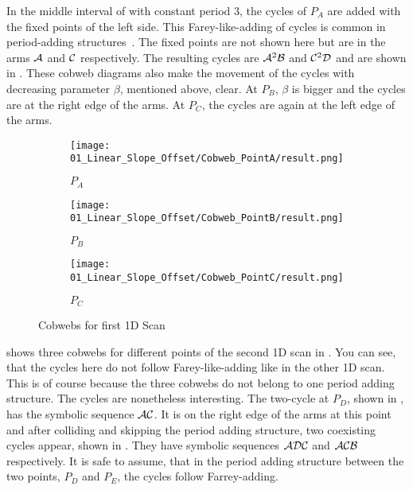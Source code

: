 In the middle interval of  with constant period 3, the cycles of $P_A$ are added with the fixed points of the left side.
This Farey-like-adding of cycles is common in period-adding structures~\cite{avrutin2019continuous}.
The fixed points are not shown here but are in the arms $\mathcal{A}$ and $\mathcal{C}$ respectively.
The resulting cycles are $\mathcal{A}^2\mathcal{B}$ and $\mathcal{C}^2\mathcal{D}$ and are shown in .
These cobweb diagrams also make the movement of the cycles with decreasing parameter $\beta$, mentioned above, clear.
At $P_B$, $\beta$ is bigger and the cycles are at the right edge of the arms.
At $P_C$, the cycles are again at the left edge of the arms.

\begin{figure}
    \centering
    \begin{subfigure}{0.3\textwidth}
        \centering
        \texttt{[image: 01\_Linear\_Slope\_Offset/Cobweb\_PointA/result.png]}
        \caption{$P_A$}
        \label{fig:pcw.lin.CobwebA}
    \end{subfigure}
    \begin{subfigure}{0.3\textwidth}
        \centering
        \texttt{[image: 01\_Linear\_Slope\_Offset/Cobweb\_PointB/result.png]}
        \caption{$P_B$}
        \label{fig:pcw.lin.CobwebB}
    \end{subfigure}
    \begin{subfigure}{0.3\textwidth}
        \centering
        \texttt{[image: 01\_Linear\_Slope\_Offset/Cobweb\_PointC/result.png]}
        \caption{$P_C$}
        \label{fig:pcw.lin.CobwebC}
    \end{subfigure}
    \caption{Cobwebs for first 1D Scan}
    \label{fig:pcw.lin.CobwebA-C}
\end{figure}

 shows three cobwebs for different points of the second 1D scan in .
You can see, that the cycles here do not follow Farey-like-adding like in the other 1D scan.
This is of course because the three cobwebs do not belong to one period adding structure.
The cycles are nonetheless interesting.
The two-cycle at $P_D$, shown in , has the symbolic sequence $\mathcal{A}\mathcal{C}$.
It is on the right edge of the arms at this point and after colliding and skipping the period adding structure, two coexisting cycles appear, shown in .
They have symbolic sequences $\mathcal{A}\mathcal{D}\mathcal{C}$ and $\mathcal{A}\mathcal{C}\mathcal{B}$ respectively.
It is safe to assume, that in the period adding structure between the two points, $P_D$ and $P_E$, the cycles follow Farrey-adding.

